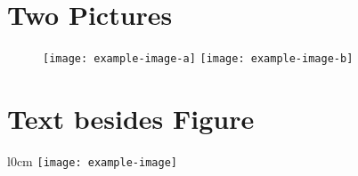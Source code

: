 \documentclass{article}
\begin{document}
	
	\section{Two Pictures}
	
	\begin{figure}[h]
		\texttt{[image: example-image-a]}
		\hfill
		\texttt{[image: example-image-b]}
	\end{figure}
	
	\section{Text besides Figure}
	
	\lipsum[1]
	
	\begin{wrapfigure}{l}{0cm}
		\texttt{[image: example-image]}
	\end{wrapfigure}
	
	\lipsum[1]
\end{document}
